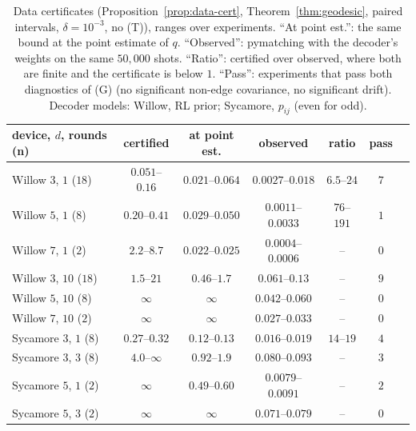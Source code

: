 \documentclass[11pt]{article}
\theoremstyle{plain}
\theoremstyle{definition}
\theoremstyle{remark}
\renewcommand{\_}{\oldunderscore\allowbreak}
\begin{document}
\begin{table}[!htb]
\centering\small\setlength{\tabcolsep}{4pt}
\begin{tabular}{lcccccc}
\toprule
device, $d$, rounds (n) & certified & at point est. & observed & ratio & pass\\
\midrule
Willow $3$, $1$ ($18$) & $0.051$--$0.16$ & $0.021$--$0.064$ & $0.0027$--$0.018$ & $6.5$--$24$ & $7$\\
Willow $5$, $1$ ($8$) & $0.20$--$0.41$ & $0.029$--$0.050$ & $0.0011$--$0.0033$ & $76$--$191$ & $1$\\
Willow $7$, $1$ ($2$) & $2.2$--$8.7$ & $0.022$--$0.025$ & $0.0004$--$0.0006$ & -- & $0$\\
Willow $3$, $10$ ($18$) & $1.5$--$21$ & $0.46$--$1.7$ & $0.061$--$0.13$ & -- & $9$\\
Willow $5$, $10$ ($8$) & $\infty$ & $\infty$ & $0.042$--$0.060$ & -- & $0$\\
Willow $7$, $10$ ($2$) & $\infty$ & $\infty$ & $0.027$--$0.033$ & -- & $0$\\
Sycamore $3$, $1$ ($8$) & $0.27$--$0.32$ & $0.12$--$0.13$ & $0.016$--$0.019$ & $14$--$19$ & $4$\\
Sycamore $3$, $3$ ($8$) & $4.0$--$\infty$ & $0.92$--$1.9$ & $0.080$--$0.093$ & -- & $3$\\
Sycamore $5$, $1$ ($2$) & $\infty$ & $0.49$--$0.60$ & $0.0079$--$0.0091$ & -- & $2$\\
Sycamore $5$, $3$ ($2$) & $\infty$ & $\infty$ & $0.071$--$0.079$ & -- & $0$\\
\bottomrule
\end{tabular}
\caption{Data certificates (Proposition~\ref{prop:data-cert}, Theorem~\ref{thm:geodesic}, paired intervals, $\delta=10^{-3}$, no (T)), ranges over experiments. ``At point est.'': the same bound at the point estimate of $q$. ``Observed'': pymatching with the decoder's weights on the same $50{,}000$ shots. ``Ratio'': certified over observed, where both are finite and the certificate is below $1$. ``Pass'': experiments that pass both diagnostics of (G) (no significant non-edge covariance, no significant drift). Decoder models: Willow, RL prior; Sycamore, $p_{ij}$ (even for odd).}\label{tab:data}
\end{table}
\end{document}
